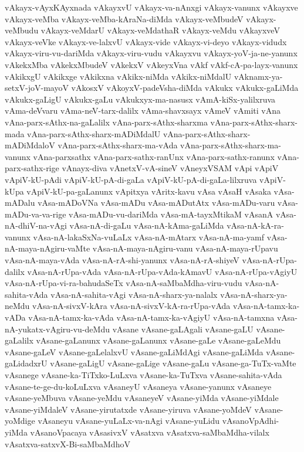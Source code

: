{vAkayx-vAyxKAyxnada
vAkayxvU
vAkayx-va-nAnxgi
vAkayx-vanunx
vAkayxve
vAkayx-veMba
vAkayx-veMba-kAraNa-diMda
vAkayx-veMbudeV
vAkayx-veMbudu
vAkayx-veMdarU
vAkayx-veMdathaR
vAkayx-veMdu
vAkayxveV
vAkayx-veVke
vAkayx-ve-lalxvU
vAkayx-vide
vAkayx-vi-deyo
vAkayx-vidudx
vAkayx-viru-vu-dariMda
vAkayx-viru-vudu
vAkayxvu
vAkayx-yoV-ja-ne-yanunx
vAkekxMba
vAkekxMbudeV
vAkekxV
vAkeyxVna
vAkf
vAkf-cA-pa-layx-vanunx
vAkikxgU
vAkikxge
vAkikxna
vAkikx-niMda
vAkikx-niMdalU
vAknamx-ya-setxV-joV-mayoV
vAkosxV
vAkoyxV-padeVsha-diMda
vAkukx
vAkukx-gaLiMda
vAkukx-gaLigU
vAkukx-gaLu
vAkukxyx-ma-nasusx
vAmA-kiSx-yalilxruva
vAma-deVvaru
vAma-neV-tarx-dalilx
vAma-shavxsayx
vAmeV
vAmiti
vAna
vAna-parx-sAthx-na-gaLalilx
vAna-parx-sAthx-sharxma
vAna-parx-sAthx-sharx-mada
vAna-parx-sAthx-sharx-mADiMdalU
vAna-parx-sAthx-sharx-mADiMdaloV
vAna-parx-sAthx-sharx-ma-vAda
vAna-parx-sAthx-sharx-ma-vanunx
vAna-parxsathx
vAna-parx-sathx-ranUnx
vAna-parx-sathx-ranunx
vAna-parx-sathx-rige
vAnayx-diva
vAnetxV-vA-sineV
vAneyxVSAM
vApi
vApiV
vApiV-kU-pAdi
vApiV-kU-pA-di-gaLa
vApiV-kU-pA-di-gaLa-lilxruva
vApiV-kUpa
vApiV-kU-pa-gaLanunx
vApitxya
vAritx-kavu
vAsa
vAsaH
vAsaka
vAsa-mADalu
vAsa-mADoVNa
vAsa-mADu
vAsa-mADutAtx
vAsa-mADu-varu
vAsa-mADu-va-va-rige
vAsa-mADu-vu-dariMda
vAsa-mA-tayxMtikaM
vAsanA
vAsa-nA-dhiV-na-vAgi
vAsa-nA-di-gaLu
vAsa-nA-kAma-gaLiMda
vAsa-nA-kA-ra-vanunx
vAsa-nA-lakaSxNa-vuLaLx
vAsa-nA-mAtarx
vAsa-nA-ma-yamf
vAsa-nA-maya-nAgiru-vaMte
vAsa-nA-maya-nAgiru-vanu
vAsa-nA-maya-rUpavu
vAsa-nA-maya-vAda
vAsa-nA-rA-shi-yanunx
vAsa-nA-rA-shiyeV
vAsa-nA-rUpa-dalilx
vAsa-nA-rUpa-vAda
vAsa-nA-rUpa-vAda-kAmavU
vAsa-nA-rUpa-vAgiyU
vAsa-nA-rUpa-vi-ra-bahudaSeTx
vAsa-nA-saMbaMdha-viru-vudu
vAsa-nA-sahita-vAda
vAsa-nA-sahita-vAgi
vAsa-nA-sharx-ya-nalalx
vAsa-nA-sharx-ya-neMdu
vAsa-nA-sivxV-kAra
vAsa-nA-sivxV-kA-ra-rUpa-vAda
vAsa-nA-tamx-ka-vADa
vAsa-nA-tamx-ka-vAda
vAsa-nA-tamx-ka-vAgiyU
vAsa-nA-tamxna
vAsa-nA-yukatx-vAgiru-vu-deMdu
vAsane
vAsane-gaLAgali
vAsane-gaLU
vAsane-gaLalilx
vAsane-gaLanunx
vAsane-gaLanunx
vAsane-gaLe
vAsane-gaLeMdu
vAsane-gaLeV
vAsane-gaLelalxvU
vAsane-gaLiMdAgi
vAsane-gaLiMda
vAsane-gaLidadxrU
vAsane-gaLigU
vAsane-gaLige
vAsane-gaLu
vAsane-ga-TuTx-vaMte
vAsanege
vAsane-ka-TiTxko-LuLxva
vAsane-ka-TuTxva
vAsane-sahita-vAda
vAsane-te-ge-du-koLuLxva
vAsaneyU
vAsaneya
vAsane-yanunx
vAsaneye
vAsane-yeMbuva
vAsane-yeMdu
vAsaneyeV
vAsane-yiMda
vAsane-yiMdale
vAsane-yiMdaleV
vAsane-yirutatxde
vAsane-yiruva
vAsane-yoMdeV
vAsane-yoMdige
vAsaneyu
vAsane-yuLaLx-va-nAgi
vAsane-yuLidu
vAsanoVpAdhi-yiMda
vAsanoVpacaya
vAsasivxV
vAsatxva
vAsatxva-saMbaMdha-vilalx
vAsatxva-satxvX-Bi-saMbaMdhoV
}
